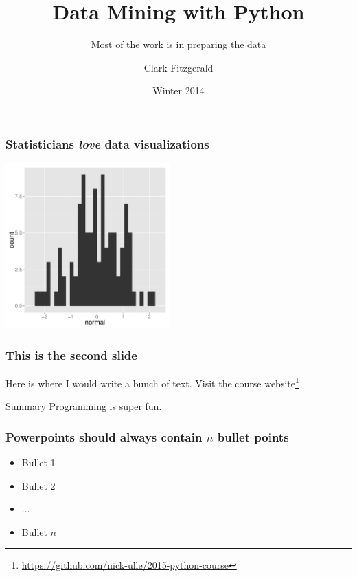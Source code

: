 \documentclass{beamer}
\begin{document}
\title[Python] %
{Data Mining with Python}
\subtitle{Most of the work is in preparing the data}
\author{Clark Fitzgerald}
\date{Winter 2014} %
\subject{Statistics}


\frame{\titlepage}


\begin{frame}
\frametitle{Statisticians \emph{love} data visualizations}
\centerline{\includegraphics[height=2.5in]{figs/normal.pdf}}
\end{frame}


\begin{frame}
\frametitle{This is the second slide}
Here is where I would write a bunch of text. Visit the course website\footnote{\url{https://github.com/nick-ulle/2015-python-course}}
    \begin{block}{Summary}
    Programming is super fun.
    \end{block}
\end{frame}


\begin{frame}
\frametitle{Powerpoints should always contain $n$ bullet points}

\begin{itemize}
\item Bullet 1
\item Bullet 2
\item ...
\item Bullet $n$
\end{itemize}

\end{frame}
\end{document}
